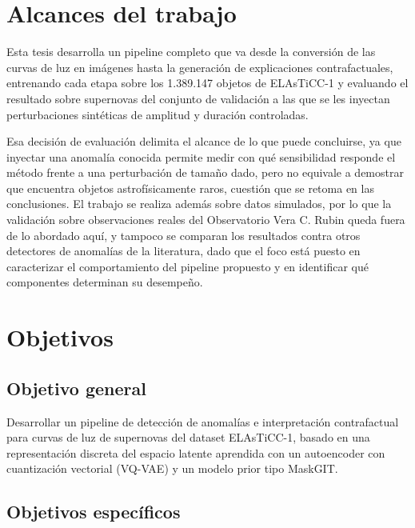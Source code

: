 \section{Alcances del trabajo}

Esta tesis desarrolla un pipeline completo que va desde la conversión de las curvas de luz en imágenes hasta la generación de explicaciones contrafactuales, entrenando cada etapa sobre los 1.389.147 objetos de ELAsTiCC-1 y evaluando el resultado sobre supernovas del conjunto de validación a las que se les inyectan perturbaciones sintéticas de amplitud y duración controladas.

Esa decisión de evaluación delimita el alcance de lo que puede concluirse, ya que inyectar una anomalía conocida permite medir con qué sensibilidad responde el método frente a una perturbación de tamaño dado, pero no equivale a demostrar que encuentra objetos astrofísicamente raros, cuestión que se retoma en las conclusiones. El trabajo se realiza además sobre datos simulados, por lo que la validación sobre observaciones reales del Observatorio Vera C. Rubin queda fuera de lo abordado aquí, y tampoco se comparan los resultados contra otros detectores de anomalías de la literatura, dado que el foco está puesto en caracterizar el comportamiento del pipeline propuesto y en identificar qué componentes determinan su desempeño.

\section{Objetivos}

\subsection{Objetivo general}

Desarrollar un pipeline de detección de anomalías e interpretación contrafactual para curvas de luz de supernovas del dataset ELAsTiCC-1, basado en una representación discreta del espacio latente aprendida con un autoencoder con cuantización vectorial (VQ-VAE) y un modelo prior tipo MaskGIT.

\subsection{Objetivos específicos}

